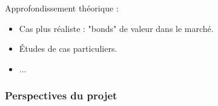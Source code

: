 \documentclass[french]{beamer}
\begin{document}
\begin{frame}
Approfondissement théorique : 
\begin{itemize}
	\item Cas plus réaliste : "bonds" de valeur dans le marché.
	\item Études de cas particuliers.
	\item ...
\end{itemize}
\frametitle{Perspectives du projet}
\end{frame}

\begin{frame}
\end{frame} %
\end{document}
